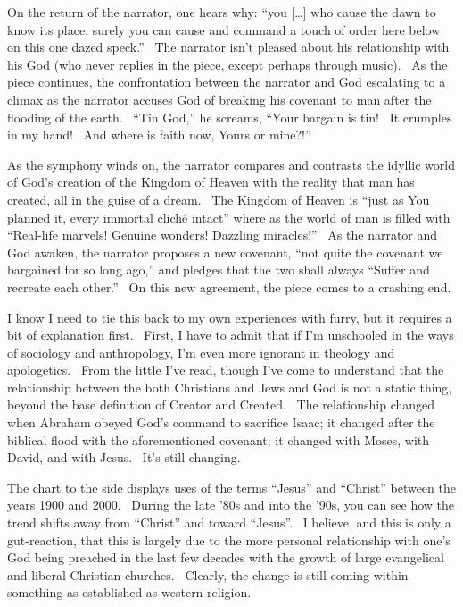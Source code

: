 On the return of the narrator, one hears why: ``you {[}\ldots{}{]} who
cause the dawn to know its place, surely you can cause and command a
touch of order here below on this one dazed speck.'' ~The narrator isn't
pleased about his relationship with his God (who never replies in the
piece, except perhaps through music). ~As the piece continues, the
confrontation between the narrator and God escalating to a climax as the
narrator accuses God of breaking his covenant to man after the flooding
of the earth. ~``Tin God,'' he screams, ``Your bargain is tin! ~It
crumples in my hand! ~And where is faith now, Yours or mine?!''

As the symphony winds on, the narrator compares and contrasts the
idyllic world of God's creation of the Kingdom of Heaven with the
reality that man has created, all in the guise of a dream. ~The Kingdom
of Heaven is ``just as You planned it, every immortal cliché intact''
where as the world of man is filled with ``Real-life marvels! Genuine
wonders! Dazzling miracles!'' ~As the narrator and God awaken, the
narrator proposes a new covenant, ``not quite the covenant we bargained
for so long ago,'' and pledges that the two shall always ``Suffer and
recreate each other.'' ~On this new agreement, the piece comes to a
crashing end.

I know I need to tie this back to my own experiences with furry, but it
requires a bit of explanation first. ~First, I have to admit that if I'm
unschooled in the ways of sociology and anthropology, I'm even more
ignorant in theology and apologetics. ~From the little I've read, though
I've come to understand that the relationship between the both
Christians and Jews and God is not a static thing, beyond the base
definition of Creator and Created. ~The relationship changed when
Abraham obeyed God's command to sacrifice Isaac; it changed after the
biblical flood with the aforementioned covenant; it changed with Moses,
with David, and with Jesus. ~It's still changing.

The chart to the side displays uses of the terms ``Jesus'' and
``Christ'' between the years 1900 and 2000. ~During the late '80s and
into the '90s, you can see how the trend shifts away from ``Christ'' and
toward ``Jesus''. ~I believe, and this is only a gut-reaction, that this
is largely due to the more personal relationship with one's God being
preached in the last few decades with the growth of large evangelical
and liberal Christian churches. ~Clearly, the change is still coming
within something as established as western religion.

